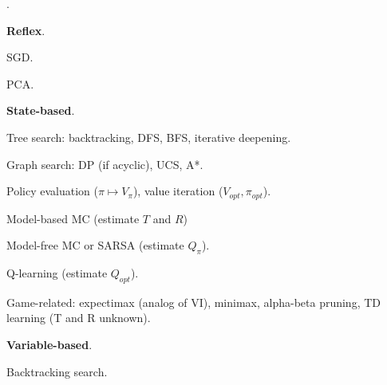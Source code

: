 \documentclass[11pt]{article}
\newcommand\myspace[1][]{\vspace{#1\bigskipamount}\Needspace{10\baselineskip}}
\newcommand\p{\Needspace{10\baselineskip} \noindent}
\newcommand\bluesec[1]{\myspace \p \blue{#1}}
\begin{document}
\bluesec{Algorithms}. 
\begin{compactitem}
	\item \textbf{Reflex}. 
	\begin{compactitem}
		\item SGD.
		\item PCA. 
	\end{compactitem}

	\item \textbf{State-based}. 
	\begin{compactitem}
		\item Tree search: backtracking, DFS, BFS, iterative deepening. 
		\item Graph search: DP (if acyclic), UCS, A*. 
		\item Policy evaluation ($\pi \mapsto V_{\pi}$), value iteration ($V_{opt}, \pi_{opt}$).
		\item Model-based MC (estimate $T$ and $R$)
		\item Model-free MC  or SARSA (estimate $Q_{\pi}$).
		\item Q-learning (estimate $Q_{opt}$).  
		\item Game-related: expectimax (analog of VI), minimax, alpha-beta pruning, TD learning (T and R unknown). 
	\end{compactitem}

	\item \textbf{Variable-based}. 
	\begin{compactitem}
		\item Backtracking search.
	\end{compactitem}
\end{compactitem}






\label{Learning from Mistakes}



\end{document}

